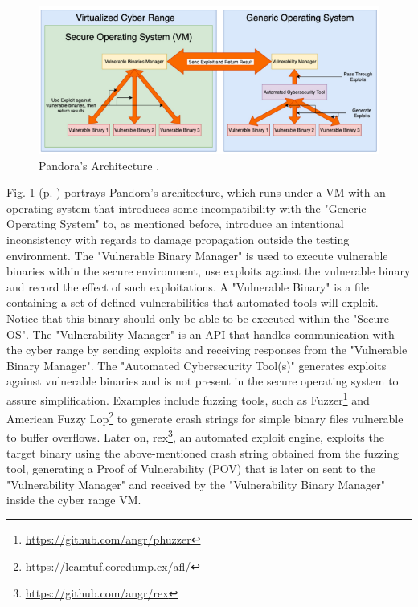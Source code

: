 \begin{figure}[H]
    \includegraphics[width=14cm]{figures/pandora_architecture.png}
    \caption{Pandora's Architecture \cite{cytrone_ref}.}
    \label{fig:pandora_architecture}
\end{figure}

Fig. \ref{fig:pandora_architecture} (p. \pageref{fig:pandora_architecture}) portrays Pandora's architecture, which runs under a VM with an operating system that introduces some incompatibility with the "Generic Operating System" to, as mentioned before, introduce an intentional inconsistency with regards to damage propagation outside the testing environment. The "Vulnerable Binary Manager" is used to execute vulnerable binaries within the secure environment, use exploits against the vulnerable binary and record the effect of such exploitations. A "Vulnerable Binary" is a file containing a set of defined vulnerabilities that automated tools will exploit. Notice that this binary should only be able to be executed within the "Secure OS". The "Vulnerability Manager" is an API that handles communication with the cyber range by sending exploits and receiving responses from the "Vulnerable Binary Manager". The "Automated Cybersecurity Tool(s)" generates exploits against vulnerable binaries and is not present in the secure operating system to assure simplification. Examples include fuzzing tools, such as Fuzzer\footnote{\url{https://github.com/angr/phuzzer}} and American Fuzzy Lop\footnote{\url{https://lcamtuf.coredump.cx/afl/}} to generate crash strings for simple binary files vulnerable to buffer overflows. Later on, rex\footnote{\url{https://github.com/angr/rex}}, an automated exploit engine, exploits the target binary using the above-mentioned crash string obtained from the fuzzing tool, generating a Proof of Vulnerability (POV) that is later on sent to the "Vulnerability Manager" and received by the "Vulnerability Binary Manager" inside the cyber range VM.

